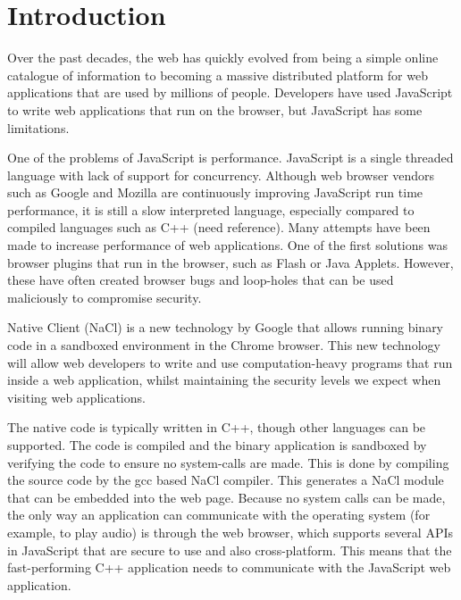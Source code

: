 
\chapter{Introduction} %

\label{Chapter1} %

Over the past decades, the web has quickly evolved from being a simple online catalogue of information to becoming a massive distributed platform for web applications that are used by millions of people. Developers have used JavaScript to write web applications that run on the browser, but JavaScript has some limitations. 

One of the problems of JavaScript is performance. JavaScript is a single threaded language with lack of support for concurrency. Although web browser vendors such as Google and Mozilla are continuously improving JavaScript run time performance, it is still a slow interpreted language, especially compared to compiled languages such as C++ (need reference). Many attempts have been made to increase performance of web applications. One of the first solutions was browser plugins that run in the browser, such as Flash or Java Applets. However, these have often created browser bugs and loop-holes that can be used maliciously to compromise security.

Native Client \cite{yee2009native} (NaCl) is a new technology by Google that allows running binary code in a sandboxed environment in the Chrome browser. This new technology will allow web developers to write and use computation-heavy programs that run inside a web application, whilst maintaining the security levels we expect when visiting web applications.

The native code is typically written in C++, though other languages can be supported. The code is compiled and the binary application is sandboxed by verifying the code to ensure no system-calls are made. This is done by compiling the source code by the gcc based NaCl compiler. This generates a NaCl module that can be embedded into the web page. Because no system calls can be made, the only way an application can communicate with the operating system (for example, to play audio) is through the web browser, which supports several APIs in JavaScript that are secure to use and also cross-platform. This means that the fast-performing C++ application needs to communicate with the JavaScript web application.


